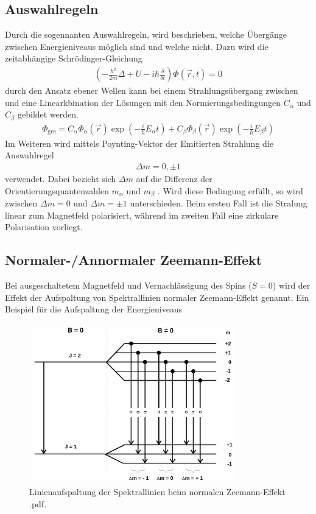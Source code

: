 \subsection{Auswahlregeln}
\label{sec:Auswahlregeln}
Durch die sogennanten Auswahlregeln, wird beschrieben, welche Übergänge zwischen
Energieniveaus möglich sind und welche nicht. Dazu wird die zeitabhängige
Schrödinger-Gleichung
\begin{align}
  \left( -\frac{\hbar^2}{2m}\Delta+U-i\hbar \frac{\delta}{\delta t} \right)\Phi\left(\vec{r}, t \right) = 0
  \label{eqn:schroedinger}
\end{align}
durch den Ansatz ebener Wellen kann bei einem Strahlungsübergang zwischen \alpha
und \beta eine Linearkbination der Lösungen mit den Normierungsbedingungen $C_\alpha$
und $C_\beta$ gebildet werden.
\begin{align}
  \Phi_\text{ges} = C_\alpha \Phi_\alpha\left(\vec{r}\right)\exp{\left(-\frac{i}{\hbar}E_\alpha t\right)} + C_\beta \Phi_\beta\left(\vec{r}\right)\exp{\left(-\frac{i}{\hbar}E_\beta t\right)}
  \label{eqn:ebenewelle}
\end{align}
Im Weiteren wird mittels Poynting-Vektor der Emitierten Strahlung die Auswahlregel
\begin{align}
  \Delta m = 0, \pm 1
  \label{eqn:auswahl}
\end{align}
verwendet. Dabei bezieht sich $\Delta m$ auf die Differenz der Orientierungsquantenzahlen
$m_\alpha$ und $m_\beta$ . Wird diese Bedingung erfüllt, so wird zwischen $\Delta m = 0$
und $\Delta m = \pm 1$ unterschieden. Beim ersten Fall ist die Stralung linear zum
Magnetfeld polarisiert, während im zweiten Fall eine zirkulare Polarisation vorliegt.


\subsection{Normaler-/Annormaler Zeemann-Effekt}
\label{sec:Zeemann}
Bei ausgeschaltetem Magnetfeld und Vernachlässigung des Spins ($S = \num{0}$) wird
der Effekt der Aufspaltung von Spektrallinien normaler Zeemann-Effekt genannt.
Ein Beispiel für die Aufspaltung der Energieniveaus


\begin{figure}[htb]
  \centering
  \includegraphics[width=0.8\textwidth]{images/V27_3.pdf}
  \caption{Linienaufspaltung der Spektrallinien beim normalen Zeemann-Effekt
  \cite{anleitung}.pdf.}
  \label{abb:normal}
\end{figure}

